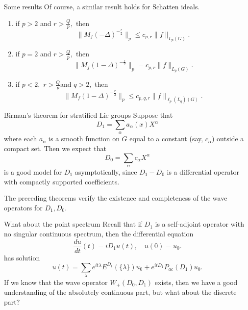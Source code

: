 \documentclass{beamer}
\numberwithin{equation}{section}
\theoremstyle{plain}
\theoremstyle{plain}
\theoremstyle{definition}
\theoremstyle{plain}
\theoremstyle{plain}
\theoremstyle{definition}
\begin{document}
\begin{frame}{Some results}
Of course, a similar result holds for Schatten ideals.

\begin{theorem}\label{cwikel schatten_theorem}
\begin{enumerate}[{\rm (i)}]
\item if $p>2$ and $r>\frac{Q}{p},$ then
$$\|M_f(-\Delta)^{-\frac{r}{2}}\|_p\leq c_{p,r}\|f\|_{L_p(G)}.$$
\item if $p=2$ and $r>\frac{Q}{p},$ then
$$\|M_f(1-\Delta)^{-\frac{r}{2}}\|_p=c_{p,r}\|f\|_{L_p(G)}.$$
\item if $p<2,$ $r>\frac{Q}{p}$and $q>2,$ then
$$\|M_f(1-\Delta)^{-\frac{r}{2}}\|_p\leq c_{p,q,r}\|f\|_{\ell_p(L_q)(G)}.$$
\end{enumerate}
\end{theorem}
\end{frame}


\begin{frame}{Birman's theorem for stratified Lie groups}
  Suppose that
  \[
      D_1 = \sum_{\alpha} a_{\alpha}(x)X^{\alpha}
  \]
  where each $a_{\alpha}$ is a smooth function on $G$ equal to a constant (say, $c_{\alpha}$) outside a compact set.
  Then we expect that
  \[
      D_0 = \sum_{\alpha} c_{\alpha}X^{\alpha}
  \]
  is a good model for $D_1$ asymptotically, since $D_1-D_0$ is a differential operator with compactly supported coefficients.

  The preceding theorems verify the existence and completeness of the wave operators for $D_1,D_0.$
\end{frame}

\begin{frame}{What about the point spectrum}
Recall that if $D_1$ is a self-adjoint operator with no singular continuous spectrum, then the differential equation
  \[
    \frac{du}{dt}(t) = iD_1u(t),\quad u(0) = u_0.
  \]
  has solution
  \[
    u(t) = \sum_{\lambda} e^{it\lambda}E^{D_1}(\{\lambda\})u_0 + e^{itD_1}P_{ac}(D_1)u_0.
  \]
  If we know that the wave operator $W_+(D_0,D_1)$ exists, then we have a good understanding of the absolutely continuous part, but what about the discrete part?
\end{frame}
\end{document}
